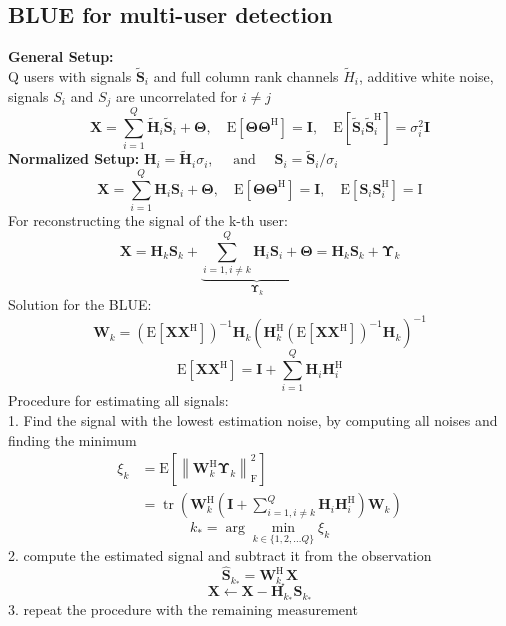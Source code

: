 \documentclass[english]{latex4ei/latex4ei_sheet}
\begin{document}
\begin{sectionbox}
  \subsection{BLUE for multi-user detection}
  \textbf{General Setup:}\\
  Q users with signals $\tilde{\boldsymbol{S}}_i$ and full column rank channels $\tilde{H}_i$, additive white noise, signals $S_i$ and $S_j$ are uncorrelated for $i\neq j$
  $$\boldsymbol{X}=\sum_{i=1}^{Q} \tilde{\boldsymbol{H}}_{i} \tilde{\boldsymbol{S}}_{i}+\boldsymbol{\Theta}, \quad \mathrm{E}\left[\boldsymbol{\Theta}\boldsymbol{\Theta}^{\mathrm{H}}\right]=\mathbf{I},\quad \mathrm{E}\left[\tilde{\boldsymbol{S}}_{i} \tilde{\boldsymbol{S}}_{i}^{\mathrm{H}}\right]=\sigma_{i}^{2} \mathbf{I}$$  
  \textbf{Normalized Setup:} $\boldsymbol{H}_{i}=\tilde{\boldsymbol{H}}_{i} \sigma_{i}, \quad \text { and } \quad \boldsymbol{S}_{i}=\tilde{\boldsymbol{S}}_{i} / \sigma_{i}$\\
  $$\boldsymbol{X}=\sum_{i=1}^{Q} \boldsymbol{H}_{i} \boldsymbol{S}_{i}+\boldsymbol{\Theta},\quad \mathrm{E}\left[\boldsymbol{\Theta} \boldsymbol{\Theta}^{\mathrm{H}}\right]=\mathbf{I}, \quad \mathrm{E}\left[\boldsymbol{S}_{i} \boldsymbol{S}_{i}^{\mathrm{H}}\right]=\mathrm{I}$$
  For reconstructing the signal of the k-th user:
  $$\boldsymbol{X}=\boldsymbol{H}_{k} \boldsymbol{S}_{k}+\underbrace{\sum_{i=1, i \neq k}^{Q} \boldsymbol{H}_{i} \boldsymbol{S}_{i}+\boldsymbol{\Theta}}_{\boldsymbol{\Upsilon}_{k}}=\boldsymbol{H}_{k} \boldsymbol{S}_{k}+\boldsymbol{\Upsilon}_{k}$$
  Solution for the BLUE:
  $$\boldsymbol{W}_{k}=\left(\mathrm{E}\left[\boldsymbol{X} \boldsymbol{X}^{\mathrm{H}}\right]\right)^{-1} \boldsymbol{H}_{k}\left(\boldsymbol{H}_{k}^{\mathrm{H}}\left(\mathrm{E}\left[\boldsymbol{X} \boldsymbol{X}^{\mathrm{H}}\right]\right)^{-1} \boldsymbol{H}_{k}\right)^{-1}$$
  $$\mathrm{E}\left[\boldsymbol{X} \boldsymbol{X}^{\mathrm{H}}\right]=\mathbf{I}+\sum_{i=1}^{Q} \boldsymbol{H}_{i} \boldsymbol{H}_{i}^{\mathrm{H}}$$
  Procedure for estimating all signals:\\
  1. Find the signal with the lowest estimation noise, by computing all noises and finding the minimum
  $$\begin{aligned}\xi_{k}&=\mathrm{E}\left[\left\|\boldsymbol{W}_{k}^{\mathrm{H}} \boldsymbol{\Upsilon}_{k}\right\|_{\mathrm{F}}^{2}\right]\\&=\operatorname{tr}\left(\boldsymbol{W}_{k}^{\mathrm{H}}\left(\mathbf{I}+\sum_{i=1, i \neq k}^{Q} \boldsymbol{H}_{i} \boldsymbol{H}_{i}^{\mathrm{H}}\right) \boldsymbol{W}_{k}\right)\end{aligned}$$
  $$k_{*}=\arg \min _{k \in\{1,2, \ldots Q\}} \xi_{k}$$
  2. compute the estimated signal and subtract it from the observation
  $$\hat{\boldsymbol{S}}_{k_{*}}=\boldsymbol{W}_{k_{\star}}^{\mathrm{H}} \boldsymbol{X}$$
  $$\boldsymbol{X} \leftarrow \boldsymbol{X}-\boldsymbol{H}_{k_{*}} \boldsymbol{S}_{k_{*}}$$
  3. repeat the procedure with the remaining measurement


\end{sectionbox}
\end{document}
